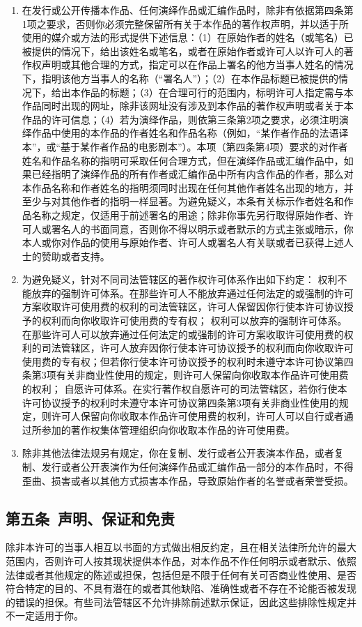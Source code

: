 \begin{enumerate}
	\item 在发行或公开传播本作品、任何演绎作品或汇编作品时，除非有依据第四条第1项之要求，否则你必须完整保留所有关于本作品的著作权声明，并以适于所使用的媒介或方法的形式提供下述信息：（1）在原始作者的姓名（或笔名）已被提供的情况下，给出该姓名或笔名，或者在原始作者或许可人以许可人的著作权声明或其他合理的方式，指定可以在作品上署名的他方当事人姓名的情况下，指明该他方当事人的名称（“署名人”）；（2）在本作品标题已被提供的情况下，给出本作品的标题；（3）在合理可行的范围内，标明许可人指定需与本作品同时出现的网址，除非该网址没有涉及到本作品的著作权声明或者关于本作品的许可信息；（4）若为演绎作品，则依第三条第2项之要求，必须注明演绎作品中使用的本作品的作者姓名和作品名称（例如，“某作者作品的法语译本”，或“基于某作者作品的电影剧本”）。本项（第四条第4项）要求的对作者姓名和作品名称的指明可采取任何合理方式，但在演绎作品或汇编作品中，如果已经指明了演绎作品的所有作者或汇编作品中所有内含作品的作者，那么对本作品名称和作者姓名的指明须同时出现在任何其他作者姓名出现的地方，并至少与对其他作者的指明一样显著。为避免疑义，本条有关标示作者姓名和作品名称之规定，仅适用于前述署名的用途；除非你事先另行取得原始作者、许可人或署名人的书面同意，否则你不得以明示或者默示的方式主张或暗示，你本人或你对作品的使用与原始作者、许可人或署名人有关联或者已获得上述人士的赞助或者支持。
	\item 为避免疑义，针对不同司法管辖区的著作权许可体系作出如下约定：
	\subitem 权利不能放弃的强制许可体系。在那些许可人不能放弃通过任何法定的或强制的许可方案收取许可使用费的权利的司法管辖区，许可人保留因你行使本许可协议授予的权利而向你收取许可使用费的专有权；
	\subitem 权利可以放弃的强制许可体系。在那些许可人可以放弃通过任何法定的或强制的许可方案收取许可使用费的权利的司法管辖区，许可人放弃因你行使本许可协议授予的权利而向你收取许可使用费的专有权；但若你行使本许可协议授予的权利时未遵守本许可协议第四条第3项有关非商业性使用的规定，则许可人保留向你收取本作品许可使用费的权利；
	\subitem 自愿许可体系。在实行著作权自愿许可的司法管辖区，若你行使本许可协议授予的权利时未遵守本许可协议第四条第3项有关非商业性使用的规定，则许可人保留向你收取本作品许可使用费的权利，许可人可以自行或者通过所参加的著作权集体管理组织向你收取本作品的许可使用费。
	\item 除非其他法律法规另有规定，你在复制、发行或者公开表演本作品，或者复制、发行或者公开表演作为任何演绎作品或汇编作品一部分的本作品时，不得歪曲、损害或者以其他方式损害本作品，导致原始作者的名誉或者荣誉受损。
\end{enumerate}
\subsection{第五条\ 声明、保证和免责}
除非本许可的当事人相互以书面的方式做出相反约定，且在相关法律所允许的最大范围内，否则许可人按其现状提供本作品，对本作品不作任何明示或者默示、依照法律或者其他规定的陈述或担保，包括但是不限于任何有关可否商业性使用、是否符合特定的目的、不具有潜在的或者其他缺陷、准确性或者不存在不论能否被发现的错误的担保。有些司法管辖区不允许排除前述默示保证，因此这些排除性规定并不一定适用于你。
